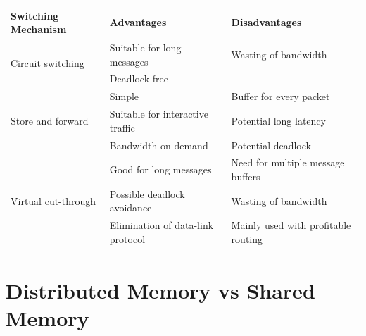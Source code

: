 \documentclass[11pt]{article}
\begin{document}
\begin{adjustwidth}{-1in}{-1in} 
\begin{center}
\begin{tabular}{ |l|l|l| } 
\hline
 Switching Mechanism & Advantages & Disadvantages \\ 
\hline
\multirow{2}{8em}{Circuit switching} & Suitable for long messages & Wasting of bandwidth \\ & Deadlock-free & \\ 
\hline
\multirow{3}{8em}{Store and forward} & Simple & Buffer for every packet  \\
& Suitable for interactive traffic & Potential long latency \\ 
& Bandwidth on demand & Potential deadlock \\ 
\hline
\multirow{3}{8em}{Virtual cut-through} & Good for long messages & Need for multiple message
buffers  \\
& Possible deadlock avoidance & Wasting of bandwidth \\ 
& Elimination of data-link
protocol & Mainly used with
profitable routing \\ 
\hline
\end{tabular}
\end{center}
\end{adjustwidth}




\section{Distributed Memory vs Shared Memory}
\end{document}
